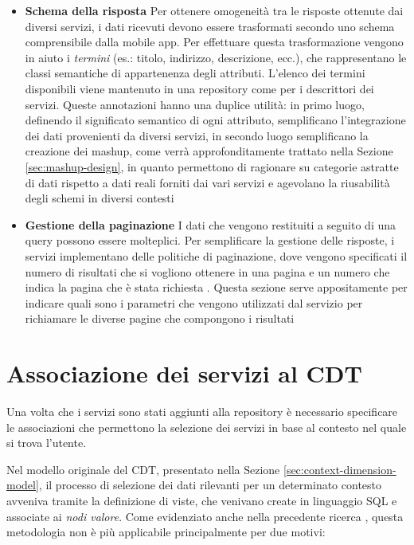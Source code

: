 \begin{itemize}
\begin{enumerate}
	\end{enumerate}
	\item \textbf{Schema della risposta} Per ottenere omogeneità tra le risposte ottenute dai diversi servizi, i dati ricevuti devono essere trasformati secondo uno schema comprensibile dalla mobile app. Per effettuare questa trasformazione vengono in aiuto i \emph{termini} (es.: titolo, indirizzo, descrizione, ecc.), che rappresentano le classi semantiche di appartenenza degli attributi. L'elenco dei termini disponibili viene mantenuto in una repository come per i descrittori dei servizi. Queste annotazioni hanno una duplice utilità: in primo luogo, definendo il significato semantico di ogni attributo, semplificano l'integrazione dei dati provenienti da diversi servizi, in secondo luogo semplificano la creazione dei mashup, come verrà approfonditamente trattato nella Sezione \ref{sec:mashup-design}, in quanto permettono di ragionare su categorie astratte di dati rispetto a dati reali forniti dai vari servizi e agevolano la riusabilità degli schemi in diversi contesti 
	\item \textbf{Gestione della paginazione} I dati che vengono restituiti a seguito di una query possono essere molteplici. Per semplificare la gestione delle risposte, i servizi implementano delle politiche di paginazione, dove vengono specificati il numero di risultati che si vogliono ottenere in una pagina e un numero che indica la pagina che è stata richiesta \cite{masse2011rest}. Questa sezione serve appositamente per indicare quali sono i parametri che vengono utilizzati dal servizio per richiamare le diverse pagine che compongono i risultati
\end{itemize}

\section{Associazione dei servizi al CDT\label{sec:associazione-servizi-cdt}}

Una volta che i servizi sono stati aggiunti alla repository è necessario specificare le associazioni che permettono la selezione dei servizi in base al contesto nel quale si trova l'utente.

Nel modello originale del CDT, presentato nella Sezione \ref{sec:context-dimension-model}, il processo di selezione dei dati rilevanti per un determinato contesto avveniva tramite la definizione di viste, che venivano create in linguaggio SQL e associate ai \emph{nodi valore}. Come evidenziato anche nella precedente ricerca \cite{rizzo2015progettazione}, questa metodologia non è più applicabile principalmente per due motivi:

